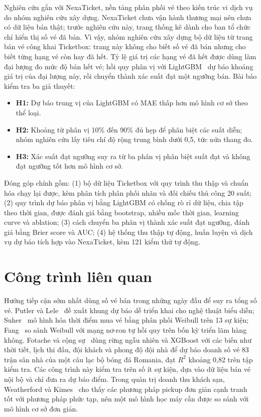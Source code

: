 \documentclass{IEEEtran}
\begin{document}
Nghiên cứu gắn với NexaTicket, nền tảng phân phối vé theo kiến trúc vi dịch vụ do nhóm nghiên cứu xây dựng. NexaTicket chưa vận hành thương mại nên chưa có dữ liệu bán thật; trước nghiên cứu này, trang thống kê dành cho ban tổ chức chỉ hiển thị số vé đã bán. Vì vậy, nhóm nghiên cứu xây dựng bộ dữ liệu từ trang bán vé công khai Ticketbox: trang này không cho biết số vé đã bán nhưng cho biết từng hạng vé còn hay đã hết. Tỷ lệ giá trị các hạng vé đã hết được dùng làm đại lượng đo mức độ bán hết vé; hồi quy phân vị với LightGBM~\cite{koenker1978,ke2017} dự báo khoảng giá trị của đại lượng này, rồi chuyển thành xác suất đạt một ngưỡng bán. Bài báo kiểm tra ba giả thuyết:
\begin{itemize}
\item \textbf{H1:} Dự báo trung vị của LightGBM có MAE thấp hơn mô hình cơ sở theo thể loại.
\item \textbf{H2:} Khoảng từ phân vị 10\% đến 90\% đủ hẹp để phân biệt các suất diễn; nhóm nghiên cứu lấy tiêu chí độ rộng trung bình dưới 0,5, tức nửa thang đo.
\item \textbf{H3:} Xác suất đạt ngưỡng suy ra từ ba phân vị phân biệt suất đạt và không đạt ngưỡng tốt hơn mô hình cơ sở.
\end{itemize}

Đóng góp chính gồm: (1) bộ dữ liệu Ticketbox với quy trình thu thập và chuẩn hóa chạy lại được, kèm phân tích phân phối nhãn và đối chiếu thủ công 20 suất; (2) quy trình dự báo phân vị bằng LightGBM có chống rò rỉ dữ liệu, chia tập theo thời gian, được đánh giá bằng bootstrap, nhiều mốc thời gian, learning curve và ablation; (3) cách chuyển ba phân vị thành xác suất đạt ngưỡng, đánh giá bằng Brier score và AUC; (4) hệ thống thu thập tự động, huấn luyện và dịch vụ dự báo tích hợp vào NexaTicket, kèm 121 kiểm thử tự động.

\section{Công trình liên quan}
\label{sec:related}
Hướng tiếp cận sớm nhất dùng số vé bán trong những ngày đầu để suy ra tổng số vé. Putler và Lele~\cite{putler2003} đề xuất khung dự báo dễ triển khai cho nghệ thuật biểu diễn; Suher~\cite{suher2008} mô hình hóa thời điểm mua vé bằng phân phối Weibull trên 13 sự kiện; Fang~\cite{fang2017} so sánh Weibull với mạng nơ-ron tự hồi quy trên bốn kỳ triển lãm hàng không. Fotache và cộng sự~\cite{fotache2021} dùng rừng ngẫu nhiên và XGBoost với các biến như thời tiết, lịch thi đấu, đội khách và phong độ đội nhà để dự báo doanh số vé 83 trận sân nhà của một câu lạc bộ bóng đá Romania, đạt $R^2$ khoảng 0,82 trên tập kiểm tra. Các công trình này kiểm tra trên số ít sự kiện, dựa vào dữ liệu bán vé nội bộ và chỉ đưa ra dự báo điểm. Trong quản trị doanh thu khách sạn, Weatherford và Kimes~\cite{weatherford2003} cho thấy các phương pháp pickup đơn giản cạnh tranh tốt với phương pháp phức tạp, nên một mô hình học máy cần được so sánh với mô hình cơ sở đơn giản.
\end{document}
